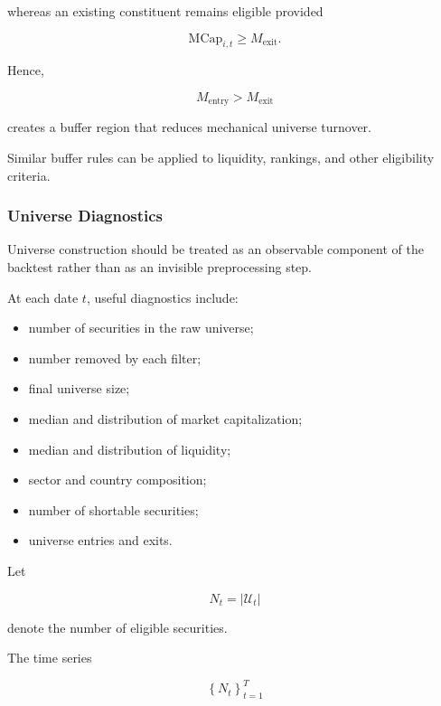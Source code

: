 \documentclass[11pt,a4paper]{article}
\begin{document}
whereas an existing constituent remains eligible provided

\begin{equation}
\mathrm{MCap}_{i,t}
\geq
M_{\mathrm{exit}}.
\end{equation}

Hence,

\begin{equation}
\boxed{
M_{\mathrm{entry}}
>
M_{\mathrm{exit}}
}
\end{equation}

creates a buffer region that reduces mechanical universe turnover.

Similar buffer rules can be applied to liquidity, rankings, and other
eligibility criteria.


\subsubsection{Universe Diagnostics}

Universe construction should be treated as an observable component of the
backtest rather than as an invisible preprocessing step.

At each date $t$, useful diagnostics include:

\begin{itemize}
    \item number of securities in the raw universe;
    \item number removed by each filter;
    \item final universe size;
    \item median and distribution of market capitalization;
    \item median and distribution of liquidity;
    \item sector and country composition;
    \item number of shortable securities;
    \item universe entries and exits.
\end{itemize}

Let

\begin{equation}
N_t
=
|\mathcal{U}_t|
\end{equation}

denote the number of eligible securities.

The time series

\begin{equation}
\left\{
N_t
\right\}_{t=1}^{T}
\end{equation}
\end{document}
